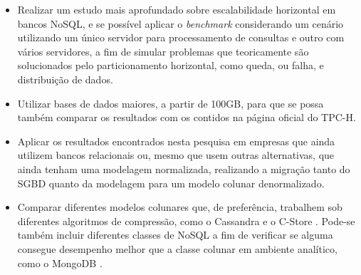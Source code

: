\begin{itemize}
    \item Realizar um estudo mais aprofundado sobre escalabilidade horizontal em bancos NoSQL, e se possível aplicar o \textit{benchmark} considerando um cenário utilizando um único servidor para processamento de consultas e outro com vários servidores, a fim de simular problemas que teoricamente são solucionados pelo particionamento horizontal, como queda, ou falha, e distribuição de dados.

    \item Utilizar bases de dados maiores, a partir de 100GB, para que se possa também comparar os resultados com os contidos na página oficial do TPC-H.

    \item Aplicar os resultados encontrados nesta pesquisa em empresas que ainda utilizem bancos relacionais ou, mesmo que usem outras alternativas, que ainda tenham uma modelagem normalizada, realizando a migração tanto do SGBD quanto da modelagem para um modelo colunar denormalizado.

    \item Comparar diferentes modelos colunares que, de preferência, trabalhem sob diferentes algoritmos de compressão, como o Cassandra \cite{cassandra2018nosql} e o C-Store \cite{cstore2018nosql}. Pode-se também incluir diferentes classes de NoSQL a fim de verificar se alguma consegue desempenho melhor que a classe colunar em ambiente analítico, como o MongoDB \cite{mongo2018nosql}.

\end{itemize}
